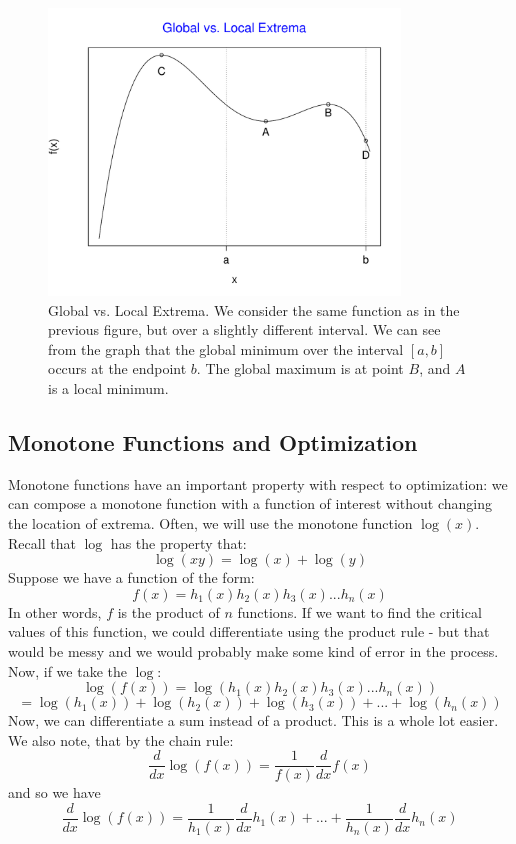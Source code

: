 \documentclass[12pt,a4paper]{article} %
\begin{document}
\begin{figure}[H]
\includegraphics[height=3in]{Extrema2.pdf}
\caption{Global vs. Local Extrema.  We consider the same function as in the previous figure, but over a slightly different interval.  We can see from the graph that the global minimum over the interval $[a,b]$ occurs at the endpoint $b$.  The global maximum is at point $B$, and $A$ is a local minimum.}
\end{figure} 
\newpage
\subsection{Monotone Functions and Optimization}
Monotone functions have an important property with respect to optimization: we can compose a monotone function with a function of interest without changing the location of extrema.  Often, we will use the monotone function $\log(x)$. Recall that $\log$ has the property that:
$$\log(xy) = \log(x) + \log(y)$$
Suppose we have a function of the form:
$$f(x) = h_1(x)h_2(x)h_3(x)...h_n(x)$$
In other words, $f$ is the product of $n$ functions.  If we want to find the critical values of this function, we could differentiate using the product rule - but that would be messy and we would probably make some kind of error in the process.  Now, if we take the $\log$:
$$\log(f(x)) = \log(h_1(x)h_2(x)h_3(x)...h_n(x))$$
$$= \log(h_1(x))+ \log(h_2(x))+\log(h_3(x))+...+\log(h_n(x))$$
Now, we can differentiate a sum instead of a product.  This is a whole lot easier.  We also note, that by the chain rule:
$$\frac{d}{dx}\log(f(x)) = \frac{1}{f(x)}\frac{d}{dx}f(x)$$
and so we have
$$\frac{d}{dx}\log(f(x)) = \frac{1}{h_1(x)}\frac{d}{dx}h_1(x)+...+\frac{1}{h_n(x)}\frac{d}{dx}h_n(x)$$
\end{document}
